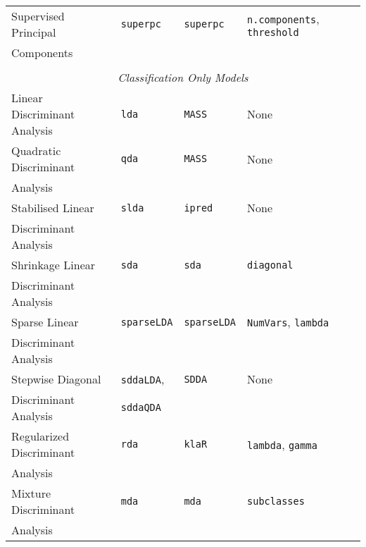 \documentclass[12pt]{article}
\begin{document}
\begin{longtable}{lllll}
      Supervised Principal &
         \texttt{superpc}  &
         \texttt{superpc}  &
         \texttt{n.components}, 
         \texttt{threshold} \\
      \:\: Components  & & &\\
      \\       
             
\multicolumn{5}{c}{{{\em Classification Only Models}}} \\ 
      Linear Discriminant Analysis &
         \texttt{lda} & 
            \texttt{MASS}       &          
            None\\
            
      Quadratic Discriminant  &
         \texttt{qda} & 
            \texttt{MASS}       &          
            None\\  
      \:\:  Analysis & & &\\               
            
      Stabilised Linear &
         \texttt{slda} & 
            \texttt{ipred}       &          
            None\\  
      \:\: Discriminant Analysis & & &\\            
            
      Shrinkage Linear &
         \texttt{sda} & 
            \texttt{sda}       &          
            \texttt{diagonal}\\  
      \:\: Discriminant Analysis & & &\\
      
      Sparse Linear &
         \texttt{sparseLDA} & 
            \texttt{sparseLDA}       &          
            \texttt{NumVars}, \texttt{lambda} \\  
      \:\: Discriminant Analysis & & &\\      
      
      Stepwise Diagonal &
        \texttt{sddaLDA}, &
        \texttt{SDDA} &
        None \\
      \:\: Discriminant Analysis & \texttt{sddaQDA} & &\\
            
      Regularized Discriminant  &
         \texttt{rda} & 
            \texttt{klaR}       & 
            \texttt{lambda}, \texttt{gamma} & \\
      \: \: Analysis \\
      
      Mixture Discriminant  &
         \texttt{mda} & 
            \texttt{mda}       & 
            \texttt{subclasses} & \\
      \: \: Analysis \\      
                     

\end{longtable}
\end{document}
